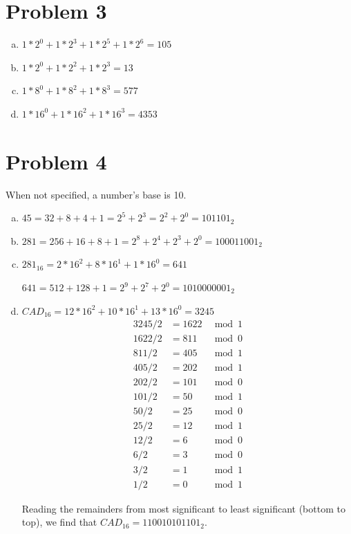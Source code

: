 \documentclass[11pt]{article}
\begin{document}
\section*{Problem 3}
	\begin{enumerate}[(a)]
		\item $ 1* 2^0 + 1 * 2^ 3 + 1* 2^5 + 1* 2^6 =105$
		\item $ 1* 2^0 + 1 * 2^2 + 1 * 2^3 = 13$
		\item $1* 8^ 0 + 1* 8 ^ 2 + 1 * 8^3 =577$
		\item $ 1* 16^0 + 1* 16^ 2 + 1* 16^ 3 = 4353$
		
	\end{enumerate}

\section*{Problem 4}
When not specified, a number's base is 10.

	\begin{enumerate}[(a)]
		\item $45 = 32 + 8 + 4 + 1 = 2^5 + 2^ 3 = 2^2 + 2^0 = 101101_2$
		\item $281= 256 + 16 + 8 + 1 = 2^8 + 2 ^ 4 + 2^ 3 + 2 ^0 = 100011001_2$
		\item $281_{16} = 2*16^2 + 8*16^1 + 1 * 16^0 = 641$
		
				$641 = 512 + 128 + 1 = 2^9 + 2^7 + 2^0 = 1010000001_2$

		\item  $CAD_{16} = 12* 16^2 + 10 * 16^1 + 13* 16^0 = 3245$
					\begin{align*}
					3245 / 2 &= 1622 &\bmod 1\\
					1622 /2 &= 811 &\bmod 0\\
					811 /2 &= 405 &\bmod 1\\
					405 /2 &= 202 &\bmod 1\\
					202 /2 &= 101 &\bmod 0\\
					101 /2 &= 50 &\bmod 1\\
					50 /2 &= 25 &\bmod 0\\
					25/2 &= 12 &\bmod 1\\
					12/2 &= 6 &\bmod 0\\
					6/2 &= 3 &\bmod 0\\
					3/2 &= 1 &\bmod 1\\
					1/2 &= 0 &\bmod 1
					\end{align*}
					
				Reading the remainders from most significant to least significant (bottom to top), we find that $CAD_{16} = 110010101101_2$.

		
	\end{enumerate}
\end{document}
